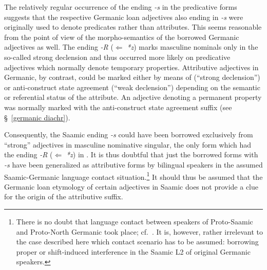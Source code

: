 {The relatively regular occurrence of the ending \textit{-s} in the predicative forms suggests that the respective Germanic loan adjectives also ending in \textit{-s} were originally used to denote predicates rather than attributes. This seems reasonable from the point of view of the morpho-semantics of the borrowed Germanic adjectives as well. The ending \textit{-R} ($\Leftarrow$ \textit{*z}) marks masculine nominals only in the so-called strong declension and thus occurred more likely on predicative adjectives which normally denote temporary properties. Attributive adjectives in Germanic, by contrast, could be marked either by means of  (“strong declension”) or anti\hyp{}construct state agreement (“weak declension”) depending on the semantic or referential status of the attribute. An adjective denoting a permanent property was normally marked with the anti\hyp{}construct state agreement suffix (see \S~\ref{germanic diachr}).

Consequently, the Saamic ending \textit{-s} could have been borrowed exclusively from “strong” adjectives in masculine nominative singular, the only form which had the ending \textit{-R} ($\Leftarrow$ \textit{*z}) in . It is thus doubtful that just the borrowed forms with \textit{-s} have been generalized as attributive forms by bilingual speakers in the assumed Saamic-Germanic language contact situation.\footnote{There is no doubt that language contact between speakers of Proto\hyp{}Saamic and Proto\hyp{}North Germanic took place; cf.~\citealt{kusmenko2008}. It is, however, rather irrelevant to the case described here which contact scenario has to be assumed: borrowing proper or shift-induced interference in the Saamic L2 of original Germanic speakers.} It should thus be assumed that the Germanic loan etymology of certain adjectives in Saamic does not provide a clue for the origin of the attributive suffix. 

}
